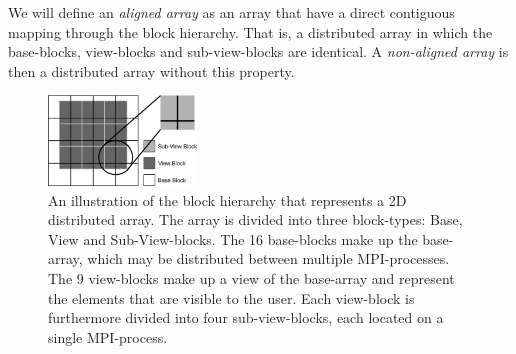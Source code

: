 \documentclass{acm_proc_article-sp}
\begin{document}



We will define an \emph{aligned array} as an array that have a direct contiguous mapping through the block hierarchy. That is, a distributed array in which the base-blocks, view-blocks and sub-view-blocks are identical. A \emph{non-aligned array} is then a distributed array without this property.

\begin{figure}
 \centering
 \includegraphics[width=150px]{gfx/view_blocks}
 \caption{An illustration of the block hierarchy that represents a 2D distributed array. The array is divided into three block-types: Base, View and Sub-View-blocks. The 16 base-blocks make up the base-array, which may be distributed between multiple MPI-processes. The 9 view-blocks make up a view of the base-array and represent the elements that are visible to the user. Each view-block is furthermore divided into four sub-view-blocks, each located on a single MPI-process.}
 \label{fig:view_block}
\end{figure}
\end{document}
